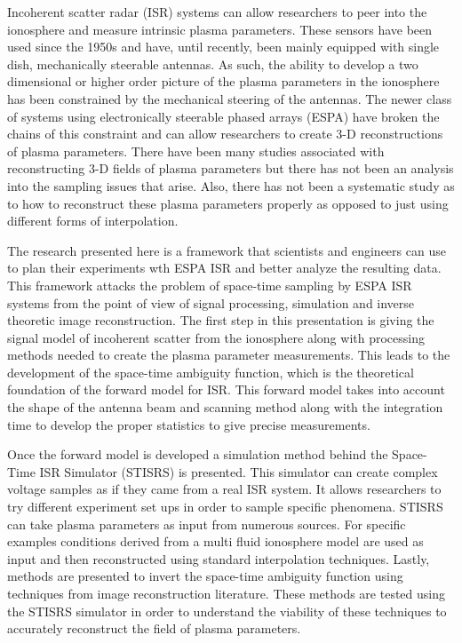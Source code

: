 
Incoherent scatter radar (ISR) systems can allow researchers to peer into the ionosphere and measure intrinsic plasma parameters. These sensors have been used since the 1950s and have, until recently, been mainly equipped with single dish, mechanically steerable antennas. As such, the ability to develop a two dimensional or higher order picture of the plasma parameters in the ionosphere has been constrained by the mechanical steering of the antennas. The newer class of systems using electronically steerable phased arrays (ESPA) have broken the chains of this constraint and can allow researchers to create 3-D reconstructions of plasma parameters. There have been many studies associated with reconstructing 3-D fields of plasma parameters but there has not been an analysis into the sampling issues that arise. Also, there has not been a systematic study as to how to reconstruct these plasma parameters properly as opposed to just using different forms of interpolation.

The research presented here is a framework that scientists and engineers can use to plan their experiments wth ESPA ISR and better analyze the resulting data. This framework attacks the problem of space-time sampling by ESPA ISR systems from the point of view of signal processing, simulation and inverse theoretic image reconstruction. The first step in this presentation is giving the signal model of incoherent scatter from the ionosphere along with processing methods needed to create the plasma parameter measurements. This leads to the development of the space-time ambiguity function, which is the theoretical foundation of the forward model for ISR. This forward model takes into account the shape of the antenna beam and scanning method along with the integration time to develop the proper statistics to give precise measurements.

Once the forward model is developed a simulation method behind the Space-Time ISR Simulator (STISRS) is presented. This simulator can create complex voltage samples as if they came from a real ISR system. It allows researchers to try different experiment set ups in order to sample specific phenomena. STISRS can take plasma parameters as input from numerous sources. For specific examples conditions derived from a multi fluid ionosphere model are used as input and then reconstructed using standard interpolation techniques. Lastly, methods are presented to invert the space-time ambiguity function using techniques from image reconstruction literature. These methods are tested using the STISRS simulator in order to understand the viability of these techniques to accurately reconstruct the field of plasma parameters.
